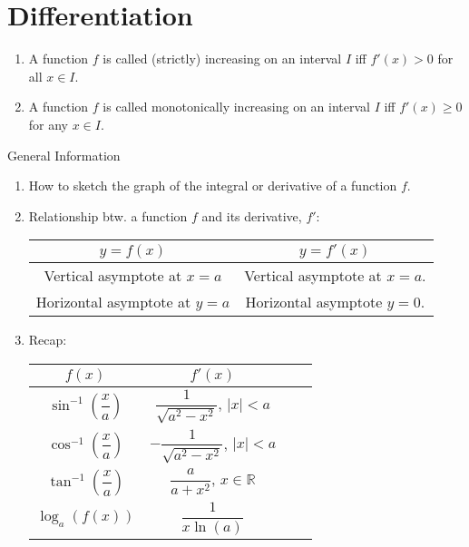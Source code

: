 \documentclass[oneside]{book}
\begin{document}
\chapter{Differentiation}
\begin{definition*}{}{}
  \begin{enumerate}
    \item A function \(f\) is called (strictly) increasing on an interval \(I\) iff \(f'(x)>0\) for all \(x \in I\).
    \item A function \(f\) is called monotonically increasing on an interval \(I\) iff \(f'(x) \geq 0\) for any \(x \in I\).
  \end{enumerate}
\end{definition*}
\begin{stbox}{General Information}
  \begin{enumerate}
    \item How to sketch the graph of the integral or derivative of a function \(f\).
    \item Relationship btw. a function \(f\) and its derivative, \(f'\):\\
    \begin{center}
      \begin{tabular}{|c|c|}
        \hline
        \(y=f(x)\) & \(y=f'(x)\)\\
        \hline
        Vertical asymptote at \(x=a\) & Vertical asymptote at \(x=a\).\\
        \hline
        Horizontal asymptote at \(y=a\) & Horizontal asymptote \(y=0\).\\
        \hline
      \end{tabular}
    \end{center}
    \item Recap:\\
    \begin{center}
      \begin{tabular}{|Sc|Sc|}
        \hline
        \(f(x)\) & \(f'(x)\)\\
        \hline
        \(\sin^{-1}\left(\dfrac{x}{a}\right)\) & \(\dfrac{1}{\sqrt{a^2-x^2}}\), \(\lvert x \rvert<a\)\\
        \hline
        \(\cos^{-1}\left(\dfrac{x}{a}\right)\) & \(-\dfrac{1}{\sqrt{a^2-x^2}}\), \(\lvert x \rvert<a\)\\
        \hline
        \(\tan^{-1}\left(\dfrac{x}{a}\right)\) & \(\dfrac{a}{a+x^2}\), \(x \in \mathbb{R}\)\\
        \hline
        \(\log_a(f(x))\) &  \(\dfrac{1}{x \ln(a)}\)\\

\end{tabular}
\end{center}
\end{enumerate}
\end{stbox}
\end{document}

